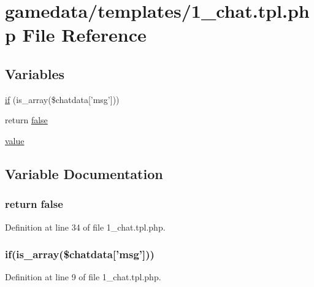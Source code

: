 \hypertarget{1__chat_8tpl_8php}{\section{gamedata/templates/1\+\_\+chat.tpl.\+php File Reference}
\label{1__chat_8tpl_8php}
}
\subsection*{Variables}
\begin{DoxyCompactItemize}
\item 
\hyperlink{1__chat_8tpl_8php_a8f783b8d09e7e8803a512d3f21cf45d9}{if} (is\+\_\+array(\$chatdata\mbox{[}'msg'\mbox{]}))
\item 
return \hyperlink{1__chat_8tpl_8php_a5df37b7f02e5cdc7d9412b7f872b8e01}{false}
\item 
\hyperlink{1__chat_8tpl_8php_afcc7a4b78ecd8fa7e713f8cfa0f51017}{value}
\end{DoxyCompactItemize}


\subsection{Variable Documentation}
\hypertarget{1__chat_8tpl_8php_a5df37b7f02e5cdc7d9412b7f872b8e01}{
\subsubsection[{false}]{\setlength{\rightskip}{0pt plus 5cm}return false}}\label{1__chat_8tpl_8php_a5df37b7f02e5cdc7d9412b7f872b8e01}


Definition at line 34 of file 1\+\_\+chat.\+tpl.\+php.

\hypertarget{1__chat_8tpl_8php_a8f783b8d09e7e8803a512d3f21cf45d9}{
\subsubsection[{if}]{\setlength{\rightskip}{0pt plus 5cm}if(is\+\_\+array(\$chatdata\mbox{[}'msg'\mbox{]}))}}\label{1__chat_8tpl_8php_a8f783b8d09e7e8803a512d3f21cf45d9}


Definition at line 9 of file 1\+\_\+chat.\+tpl.\+php.

